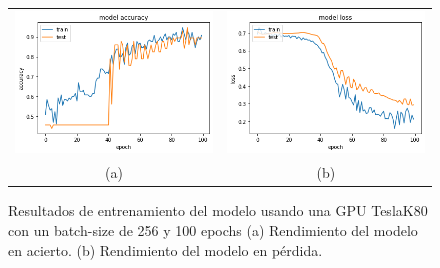 \begin{figure}
    \centering
    \begin{tabular}{cc}
        \includegraphics[height=0.35\textwidth]{images/chapter5/batch_256_100_epoch.png} &
        \includegraphics[height=0.35\textwidth]{images/chapter5/batch_256_100_epoch_loss.png}\\
        (a) & (b)\\
    \end{tabular}
    \label{fig:Resultados de entrenamiento con un batch-size de 256 y 100 epochs}
    \caption{Resultados de entrenamiento del modelo usando una GPU TeslaK80 con un batch-size de 256 y 100 epochs (a) Rendimiento del modelo en acierto. (b) Rendimiento del modelo en pérdida.}
\end{figure}

